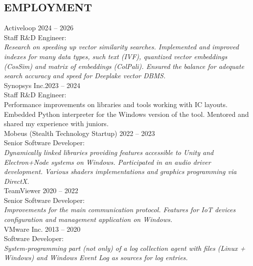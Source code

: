 \documentclass[10pt]{res}
\begin{document}
\begin{resume}
\section{EMPLOYMENT}
\vspace{5pt}
	Activeloop \hfill 2024 -- 2026 \yearpostfix \\ %
	Staff R\&D Engineer: \\
	\textit{Research on speeding up vector similarity searches. Implemented and improved indexes for many data types, such text (IVF), quantized vector embeddings (CosSim) and matrix of embeddings (ColPali). Ensured the balance for adequate search accuracy and speed for Deeplake vector DBMS.} \vspace{7pt} \\
	Synopsys Inc.\hfill 2023 -- 2024 \yearpostfix \\
	Staff R\&D Engineer: \\
	Performance improvements on libraries and tools working with IC layouts. Embedded Python interpreter for the Windows version of the tool. Mentored and shared my experience with juniors. \vspace{7pt} \\
	Mobeus (Stealth Technology Startup) \hfill 2022 -- 2023 \yearpostfix \\
	Senior Software Developer: \\
	\textit{Dynamically linked libraries providing features accessible to Unity and Electron+Node systems on Windows. Participated in an audio driver development. Various shaders implementations and graphics programming via DirectX.} \vspace{7pt} \\
	TeamViewer \hfill 2020 -- 2022 \yearpostfix \\
	Senior Software Developer: \\
	\textit{Improvements for the main communication protocol. Features for IoT devices configuration and management application on Windows.} \vspace{7pt} \\
	VMware Inc. \hfill 2013 -- 2020 \yearpostfix \\
	Software Developer: \\
	\textit{System-programming part (not only) of a log collection agent with files (Linux + Windows) and Windows Event Log as sources for log entries.} \vspace{7pt} \\

\end{resume}
\end{document}
